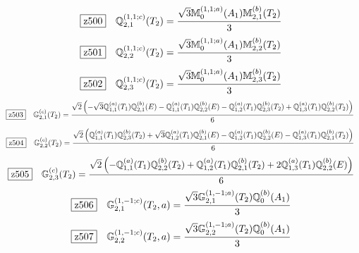 \documentclass[fleqn,10pt,landscape]{jsarticle}
\begin{document}
\begin{dmath*}
\hspace*{3mm}\fbox{z500}\quad \mathbb{Q}_{2,1}^{(1,1;c)}(T_{2})=\frac{\sqrt{3} \mathbb{M}_{0}^{(1,1;a)}(A_{1}) \mathbb{M}_{2,1}^{(b)}(T_{2})}{3}
\end{dmath*}
\begin{dmath*}
\hspace*{3mm}\fbox{z501}\quad \mathbb{Q}_{2,2}^{(1,1;c)}(T_{2})=\frac{\sqrt{3} \mathbb{M}_{0}^{(1,1;a)}(A_{1}) \mathbb{M}_{2,2}^{(b)}(T_{2})}{3}
\end{dmath*}
\begin{dmath*}
\hspace*{3mm}\fbox{z502}\quad \mathbb{Q}_{2,3}^{(1,1;c)}(T_{2})=\frac{\sqrt{3} \mathbb{M}_{0}^{(1,1;a)}(A_{1}) \mathbb{M}_{2,3}^{(b)}(T_{2})}{3}
\end{dmath*}
\begin{dmath*}
\hspace*{3mm}\fbox{z503}\quad \mathbb{G}_{2,1}^{(c)}(T_{2})=\frac{\sqrt{2} \left(- \sqrt{3} \mathbb{Q}_{1,1}^{(a)}(T_{1}) \mathbb{Q}_{2,1}^{(b)}(E) - \mathbb{Q}_{1,1}^{(a)}(T_{1}) \mathbb{Q}_{2,2}^{(b)}(E) - \mathbb{Q}_{1,2}^{(a)}(T_{1}) \mathbb{Q}_{2,3}^{(b)}(T_{2}) + \mathbb{Q}_{1,3}^{(a)}(T_{1}) \mathbb{Q}_{2,2}^{(b)}(T_{2})\right)}{6}
\end{dmath*}
\begin{dmath*}
\hspace*{3mm}\fbox{z504}\quad \mathbb{G}_{2,2}^{(c)}(T_{2})=\frac{\sqrt{2} \left(\mathbb{Q}_{1,1}^{(a)}(T_{1}) \mathbb{Q}_{2,3}^{(b)}(T_{2}) + \sqrt{3} \mathbb{Q}_{1,2}^{(a)}(T_{1}) \mathbb{Q}_{2,1}^{(b)}(E) - \mathbb{Q}_{1,2}^{(a)}(T_{1}) \mathbb{Q}_{2,2}^{(b)}(E) - \mathbb{Q}_{1,3}^{(a)}(T_{1}) \mathbb{Q}_{2,1}^{(b)}(T_{2})\right)}{6}
\end{dmath*}
\begin{dmath*}
\hspace*{3mm}\fbox{z505}\quad \mathbb{G}_{2,3}^{(c)}(T_{2})=\frac{\sqrt{2} \left(- \mathbb{Q}_{1,1}^{(a)}(T_{1}) \mathbb{Q}_{2,2}^{(b)}(T_{2}) + \mathbb{Q}_{1,2}^{(a)}(T_{1}) \mathbb{Q}_{2,1}^{(b)}(T_{2}) + 2 \mathbb{Q}_{1,3}^{(a)}(T_{1}) \mathbb{Q}_{2,2}^{(b)}(E)\right)}{6}
\end{dmath*}
\begin{dmath*}
\hspace*{3mm}\fbox{z506}\quad \mathbb{G}_{2,1}^{(1,-1;c)}(T_{2},a)=\frac{\sqrt{3} \mathbb{G}_{2,1}^{(1,-1;a)}(T_{2}) \mathbb{Q}_{0}^{(b)}(A_{1})}{3}
\end{dmath*}
\begin{dmath*}
\hspace*{3mm}\fbox{z507}\quad \mathbb{G}_{2,2}^{(1,-1;c)}(T_{2},a)=\frac{\sqrt{3} \mathbb{G}_{2,2}^{(1,-1;a)}(T_{2}) \mathbb{Q}_{0}^{(b)}(A_{1})}{3}
\end{dmath*}
\end{document}
